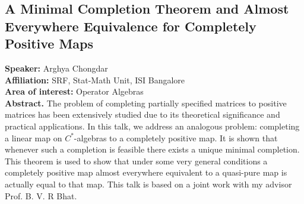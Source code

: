 %
%
\subsection*{A Minimal Completion Theorem and Almost Everywhere Equivalence for Completely Positive Maps} %
\noindent
\textbf{Speaker:} Arghya Chongdar\\ %
\textbf{Affiliation:} SRF, Stat-Math Unit, ISI Bangalore \\ %
\textbf{Area of interest:} Operator Algebras \\

\noindent\textbf{Abstract.} The problem of completing partially specified matrices to positive matrices
has been extensively studied due to its theoretical significance and practical applications.
In this talk, we address an analogous problem: completing a linear map on \(C^*\)-algebras
to a completely positive map. It is shown that whenever such a completion is feasible
there exists a unique minimal completion. This theorem is used to show that under
some very general conditions a completely positive map almost everywhere equivalent
to a quasi-pure map is actually equal to that map. This talk is based on a joint work
with my advisor Prof. B. V. R Bhat.


